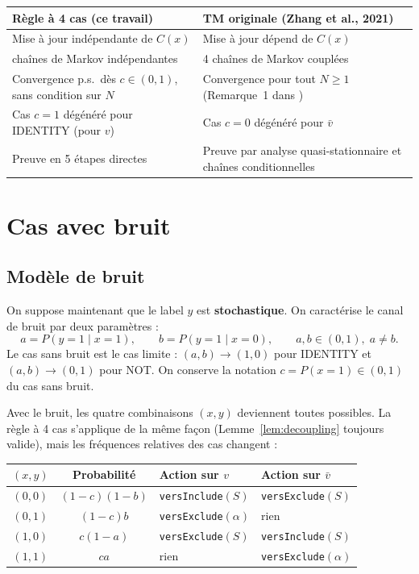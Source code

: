 \documentclass[12pt,a4paper]{article}
\theoremstyle{remark}
\newcommand{\vbar}{\bar{v}}
\begin{document}
\begin{center}
\renewcommand{\arraystretch}{1.3}
\begin{tabular}{p{6cm}p{6cm}}
\toprule
\textbf{Règle à 4 cas (ce travail)} & \textbf{TM originale (Zhang et al., 2021)} \\
\midrule
Mise à jour indépendante de $C(x)$ & Mise à jour dépend de $C(x)$ \\
\addlinespace
2 chaînes de Markov indépendantes & 4 chaînes de Markov couplées \\
\addlinespace
Convergence p.s.\ dès $c \in (0,1)$, sans condition sur $N$ & Convergence pour tout $N \ge 1$ (Remarque~1 dans \cite{zhang2021}) \\
\addlinespace
Cas $c=1$ dégénéré pour IDENTITY (pour $v$) & Cas $c=0$ dégénéré pour $\vbar$ \\
\addlinespace
Preuve en 5 étapes directes & Preuve par analyse quasi-stationnaire et chaînes conditionnelles \\
\bottomrule
\end{tabular}
\end{center}

\section{Cas avec bruit}

\subsection{Modèle de bruit}\label{sec:modele_bruit}

On suppose maintenant que le label $y$ est \textbf{stochastique}.  On caractérise le canal
de bruit par deux paramètres :
\[
  a = P(y=1 \mid x=1), \qquad b = P(y=1 \mid x=0), \qquad a,b \in (0,1),\; a \ne b.
\]
Le cas sans bruit est le cas limite : $(a,b)\to(1,0)$ pour IDENTITY et $(a,b)\to(0,1)$ pour NOT.
On conserve la notation $c = P(x=1) \in (0,1)$ du cas sans bruit.

Avec le bruit, les quatre combinaisons $(x,y)$ deviennent toutes possibles.
La règle à 4 cas s'applique de la même façon (Lemme~\ref{lem:decoupling} toujours valide),
mais les fréquences relatives des cas changent :

\begin{center}
\renewcommand{\arraystretch}{1.3}
\begin{tabular}{ccll}
\toprule
$(x,y)$ & Probabilité & Action sur $v$ & Action sur $\vbar$ \\
\midrule
$(0,0)$ & $(1-c)(1-b)$  & \texttt{versInclude}$(S)$ & \texttt{versExclude}$(S)$ \\
$(0,1)$ & $(1-c)b$      & \texttt{versExclude}$(\alpha)$ & rien \\
$(1,0)$ & $c(1-a)$     & \texttt{versExclude}$(S)$ & \texttt{versInclude}$(S)$ \\
$(1,1)$ & $ca$         & rien & \texttt{versExclude}$(\alpha)$ \\
\bottomrule
\end{tabular}
\end{center}
\end{document}
